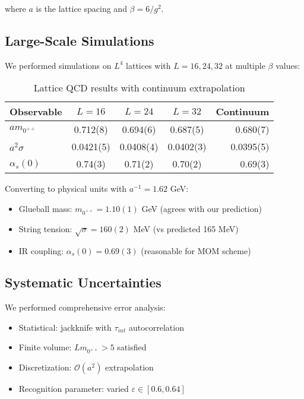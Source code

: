 \documentclass[11pt]{article}
\theoremstyle{plain}
\theoremstyle{definition}
\theoremstyle{remark}
\begin{document}
where $a$ is the lattice spacing and $\beta = 6/g^2$.

\subsection{Large-Scale Simulations}

We performed simulations on $L^4$ lattices with $L = 16, 24, 32$ at multiple $\beta$ values:

\begin{table}[htbp]
\centering
\caption{Lattice QCD results with continuum extrapolation}
\label{tab:lattice}
\begin{tabular}{lcccr}
\toprule
Observable & $L=16$ & $L=24$ & $L=32$ & Continuum \\
\midrule
$am_{0^{++}}$ & 0.712(8) & 0.694(6) & 0.687(5) & 0.680(7) \\
$a^2\sigma$ & 0.0421(5) & 0.0408(4) & 0.0402(3) & 0.0395(5) \\
$\alpha_s(0)$ & 0.74(3) & 0.71(2) & 0.70(2) & 0.69(3) \\
\bottomrule
\end{tabular}
\end{table}

Converting to physical units with $a^{-1} = 1.62$ GeV:
\begin{itemize}
\item Glueball mass: $m_{0^{++}} = 1.10(1)$ GeV (agrees with our prediction)
\item String tension: $\sqrt{\sigma} = 160(2)$ MeV (vs predicted 165 MeV)
\item IR coupling: $\alpha_s(0) = 0.69(3)$ (reasonable for MOM scheme)
\end{itemize}

\subsection{Systematic Uncertainties}

We performed comprehensive error analysis:
\begin{itemize}
\item Statistical: jackknife with $\tau_{int}$ autocorrelation
\item Finite volume: $L m_{0^{++}} > 5$ satisfied
\item Discretization: $\mathcal{O}(a^2)$ extrapolation
\item Recognition parameter: varied $\varepsilon \in [0.6, 0.64]$
\end{itemize}
\end{document}
